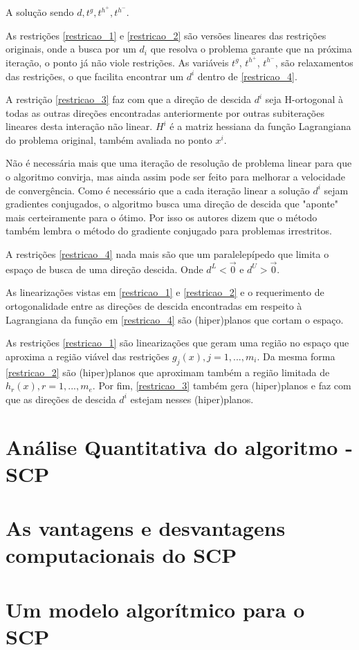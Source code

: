 A solução sendo \( d, t^g, t^{h^+}, t^{h^-} \).

As restrições \ref{restricao_1} e \ref{restricao_2} são versões lineares das restrições originais,
onde a busca por um \(d_i \) que resolva o problema garante que na próxima iteração, o ponto já não
viole restrições. As variáveis \(t^g\), \(t^{h^+}\), \(t^{h^-}\), são relaxamentos das restrições,
o que facilita encontrar um \(d^i\) dentro de \ref{restricao_4}.

A restrição \ref{restricao_3} faz com que a direção de descida \( d^i \) seja H-ortogonal à todas
as outras direções encontradas anteriormente por outras subiterações lineares desta
interação não linear. \( H^i \) é a matriz hessiana da função Lagrangiana do problema
original, também avaliada no ponto \( x^i \).

Não é necessária mais que uma iteração de resolução de problema linear para
que o algoritmo convirja, mas ainda assim pode ser feito para melhorar a velocidade
de convergência. Como é necessário que a cada iteração linear a solução
\( d^i \) sejam gradientes conjugados, o algoritmo busca uma direção de descida que
"aponte" mais certeiramente para o ótimo. Por isso os autores dizem que o método
também lembra o método do gradiente conjugado para problemas irrestritos.

A restrições \ref{restricao_4} nada mais são que um paralelepípedo que limita o espaço de busca de uma
direção descida. Onde \( d^L < \overrightarrow 0 \) e \( d^U > \overrightarrow 0 \).

As linearizações vistas em \ref{restricao_1} e \ref{restricao_2} e o requerimento de ortogonalidade entre
as direções de descida encontradas em respeito à Lagrangiana da função em \ref{restricao_4} são (hiper)planos
que cortam o espaço.

As restrições \ref{restricao_1} são linearizações que geram uma região no espaço que aproxima a região viável
das restrições \( g_j(x), j=1, ..., m_i \). Da mesma forma \ref{restricao_2} são (hiper)planos que aproximam
também a região limitada de \( h_r(x), r=1, ..., m_e \). Por fim, \ref{restricao_3} também gera (hiper)planos
e faz com que as direções de descida \( d^i \) estejam nesses (hiper)planos.

\section{Análise Quantitativa do algoritmo - SCP}
\section{As vantagens e desvantagens computacionais do SCP}
\section{Um modelo algorítmico para o SCP}
